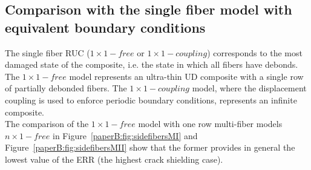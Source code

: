 %

\subsection{Comparison with the single fiber model with equivalent boundary conditions}

The single fiber RUC ($1\times 1-free$ or $1\times 1-coupling$) corresponds to the most damaged state of the composite, i.e. the state in which all fibers have debonds. The $1\times 1-free$ model represents an ultra-thin UD composite with a single row of partially debonded fibers. The $1\times 1-coupling$ model, where the displacement coupling is used to enforce periodic boundary conditions, represents an infinite composite.\\
The comparison of the $1\times 1-free$  model with one row multi-fiber models $n\times 1-free$ in Figure~\ref{paperB:fig:sidefibersMI} and Figure~\ref{paperB:fig:sidefibersMII} show that the former provides in general the lowest value of the ERR (the highest crack shielding case).

%


